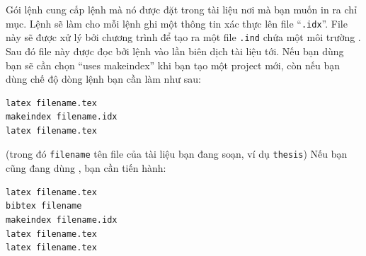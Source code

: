\documentclass[a4paper]{report}
\begin{document}
\noindent Gói lệnh   cung cấp lệnh   mà nó được đặt trong tài liệu nơi mà bạn muốn in ra chỉ mục.
 \noindent Lệnh   sẽ làm cho mỗi lệnh  ghi một thông tin xác thực lên file ``\texttt{.idx}''. File này sẽ được xử lý bởi chương trình  để tạo ra một file \texttt{.ind} chứa một môi trường . Sau đó file này được đọc bởi lệnh  vào lần biên dịch tài liệu tới. Nếu bạn dùng  bạn sẽ cần chọn ``uses makeindex'' khi bạn tạo một project mới, còn nếu bạn dùng chế độ dòng lệnh bạn cần làm như sau:

\begin{verbatim}
latex filename.tex    
makeindex filename.idx
latex filename.tex
\end{verbatim}
(trong đó \texttt{filename} tên file của tài liệu bạn đang soạn, ví dụ \texttt{thesis})
Nếu bạn cũng đang dùng \BiBTeX, bạn cần tiến hành:
\begin{verbatim}
latex filename.tex
bibtex filename
makeindex filename.idx
latex filename.tex
latex filename.tex
\end{verbatim}
\end{document}
